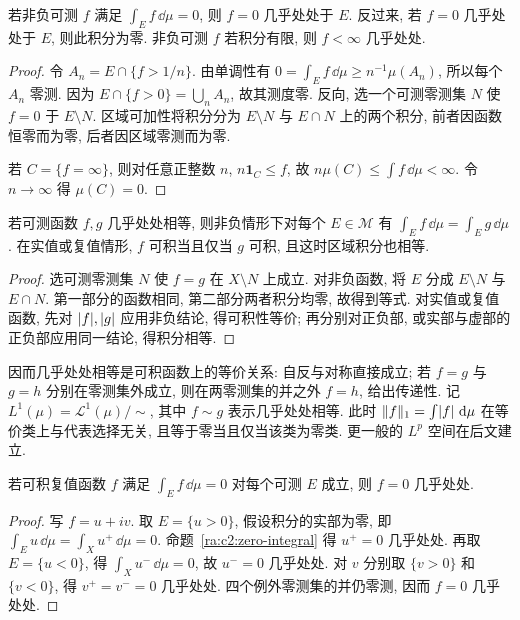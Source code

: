 \begin{proposition}\label{ra:c2:zero-integral}
若非负可测 $f$ 满足 $\int_E f\,\dd\mu=0$, 则 $f=0$ 几乎处处于 $E$. 反过来, 若 $f=0$ 几乎处处于 $E$, 则此积分为零. 非负可测 $f$ 若积分有限, 则 $f<\infty$ 几乎处处.
\end{proposition}
\begin{proof}
令 $A_n=E\cap\{f>1/n\}$. 由单调性有 $0=\int_Ef\,\dd\mu\ge n^{-1}\mu(A_n)$, 所以每个 $A_n$ 零测. 因为 $E\cap\{f>0\}=\bigcup_n A_n$, 故其测度零. 反向, 选一个可测零测集 $N$ 使 $f=0$ 于 $E\setminus N$. 区域可加性将积分分为 $E\setminus N$ 与 $E\cap N$ 上的两个积分, 前者因函数恒零而为零, 后者因区域零测而为零.

若 $C=\{f=\infty\}$, 则对任意正整数 $n$, $n\mathbf1_C\le f$, 故 $n\mu(C)\le\int f\,\dd\mu<\infty$. 令 $n\to\infty$ 得 $\mu(C)=0$.
\end{proof}

\begin{proposition}\label{ra:c2:ae-invariance}
若可测函数 $f,g$ 几乎处处相等, 则非负情形下对每个 $E\in\mathcal M$ 有 $\int_Ef\,\dd\mu=\int_Eg\,\dd\mu$. 在实值或复值情形, $f$ 可积当且仅当 $g$ 可积, 且这时区域积分也相等.
\end{proposition}
\begin{proof}
选可测零测集 $N$ 使 $f=g$ 在 $X\setminus N$ 上成立. 对非负函数, 将 $E$ 分成 $E\setminus N$ 与 $E\cap N$. 第一部分的函数相同, 第二部分两者积分均零, 故得到等式. 对实值或复值函数, 先对 $\lvert f\rvert,\lvert g\rvert$ 应用非负结论, 得可积性等价; 再分别对正负部, 或实部与虚部的正负部应用同一结论, 得积分相等.
\end{proof}
因而几乎处处相等是可积函数上的等价关系: 自反与对称直接成立; 若 $f=g$ 与 $g=h$ 分别在零测集外成立, 则在两零测集的并之外 $f=h$, 给出传递性. 记 $L^1(\mu)=\mathcal L^1(\mu)/{\sim}$, 其中 $f\sim g$ 表示几乎处处相等. 此时 $\|f\|_1=\int\lvert f\rvert\,\,\mathrm d\mu$ 在等价类上与代表选择无关, 且等于零当且仅当该类为零类. 更一般的 $L^p$ 空间在后文建立.

\begin{proposition}\label{ra:c2:local-zero}
若可积复值函数 $f$ 满足 $\int_Ef\,\dd\mu=0$ 对每个可测 $E$ 成立, 则 $f=0$ 几乎处处.
\end{proposition}
\begin{proof}
写 $f=u+iv$. 取 $E=\{u>0\}$, 假设积分的实部为零, 即 $\int_Eu\,\dd\mu=\int_Xu^+\,\dd\mu=0$. 命题~\ref{ra:c2:zero-integral} 得 $u^+=0$ 几乎处处. 再取 $E=\{u<0\}$, 得 $\int_Xu^-\,\dd\mu=0$, 故 $u^-=0$ 几乎处处. 对 $v$ 分别取 $\{v>0\}$ 和 $\{v<0\}$, 得 $v^+=v^-=0$ 几乎处处. 四个例外零测集的并仍零测, 因而 $f=0$ 几乎处处.
\end{proof}

